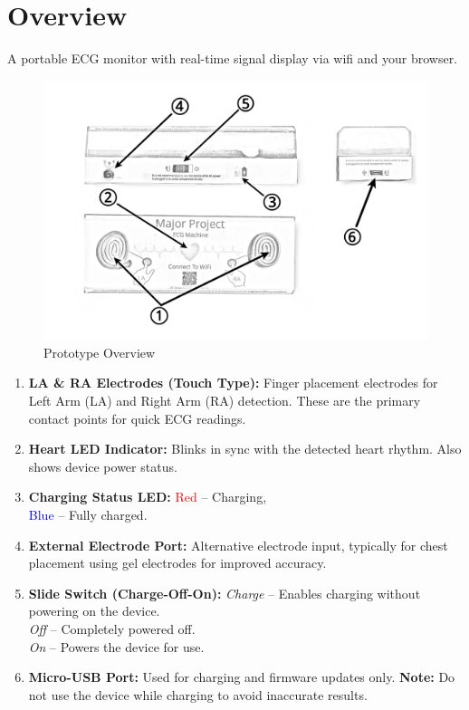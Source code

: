 \documentclass[twoside]{article}
\begin{document}
\section{Overview}
A portable ECG monitor with real-time signal display via wifi and your browser.
\begin{figure}[H]
    \centering
    \includegraphics[scale=1.5]{images/prototype-overview.png}
    \caption{Prototype Overview}
    \label{fig:prototype_overview}
\end{figure}
{\small
\begin{enumerate}
    \item \textbf{LA \& RA Electrodes (Touch Type):} Finger placement electrodes for Left Arm (LA) and Right Arm (RA) detection. These are the primary contact points for quick ECG readings.
    \item \textbf{Heart LED Indicator:} Blinks in sync with the detected heart rhythm. Also shows device power status.
    \item \textbf{Charging Status LED:} \textcolor{red}{Red} – Charging,\\ \textcolor{blue}{Blue} – Fully charged.
    \item \textbf{External Electrode Port:} Alternative electrode input, typically for chest placement using gel electrodes for improved accuracy.
    \item \textbf{Slide Switch (Charge-Off-On):} \textit{Charge} – Enables charging without powering on the device.\\ \textit{Off} – Completely powered off.\\ \textit{On} – Powers the device for use.
    \item \textbf{Micro-USB Port:} Used for charging and firmware updates only. \textbf{Note:} Do not use the device while charging to avoid inaccurate results.
\end{enumerate}
}
\end{document}
